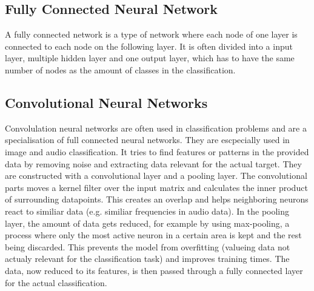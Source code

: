 \subsection{Fully Connected Neural Network}
A fully connected network is a type of network where each node of one layer is connected to each node on the following layer.
It is often divided into a input layer, multiple hidden layer and one output layer, which has to have the same number
of nodes as the amount of classes in the classification.

\subsection{Convolutional Neural Networks}
Convolulation neural networks are often used in classification problems and are a specialisation of full connected neural networks. They are escpecially used 
in image and audio classification. It tries to find features or patterns in the provided data by removing noise and extracting data relevant for the actual target. 
They are constructed with a convolutional layer and a pooling layer. The convolutional parts moves a kernel filter over the input matrix and calculates the inner product of
surrounding datapoints. This creates an overlap and helps neighboring neurons react to similiar data (e.g. similiar frequencies in audio data). In the pooling layer, 
the amount of data gets reduced, for example by using max-pooling, a process where only the most active neuron in a certain area is kept and the rest being discarded.
This prevents the model from overfitting (valueing data not actualy relevant for the classification task) and improves training times. The data, now reduced to
its features, is then passed through a fully connected layer for the actual classification.
